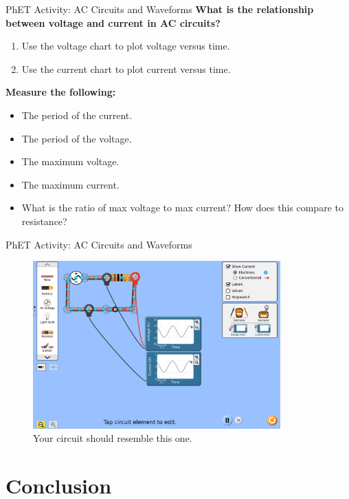 \documentclass{beamer}
\begin{document}
\begin{frame}{PhET Activity: AC Circuits and Waveforms}
\textbf{What is the relationship between voltage and current in AC circuits?}
\begin{enumerate}
\item Use the voltage chart to plot voltage versus time.
\item Use the current chart to plot current versus time.
\end{enumerate}
\textbf{\alert{Measure the following:}}
\begin{itemize}
\item The period of the current.
\item The period of the voltage.
\item The maximum voltage.
\item The maximum current.
\item What is the ratio of max voltage to max current?  How does this compare to resistance?
\end{itemize}
\end{frame}

\begin{frame}{PhET Activity: AC Circuits and Waveforms}
\begin{figure}
\centering
\includegraphics[width=0.85\textwidth]{figures/PhET_AC_2.png}
\caption{\label{fig:phet_ac_2} Your circuit should resemble this one.}
\end{figure}
\end{frame}


\section{Conclusion}
\end{document}
